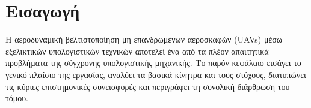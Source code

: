 
\chapter{Εισαγωγή}
\label{ch:introduction}

Η αεροδυναμική βελτιστοποίηση μη επανδρωμένων αεροσκαφών (UAVs) μέσω εξελικτικών υπολογιστικών τεχνικών αποτελεί ένα από τα πλέον απαιτητικά προβλήματα της σύγχρονης υπολογιστικής μηχανικής. Το παρόν κεφάλαιο εισάγει το γενικό πλαίσιο της εργασίας, αναλύει τα βασικά κίνητρα και τους στόχους, διατυπώνει τις κύριες επιστημονικές συνεισφορές και περιγράφει τη συνολική διάρθρωση του τόμου.
